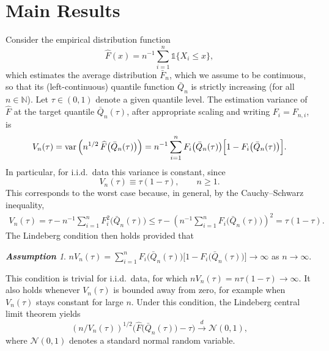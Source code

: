 \documentclass[12pt]{article}
\theoremstyle{remark}
\newtheorem{assumption}{\textbf{Assumption}}
\newcommand{\var}{\operatorname{var}}
\newcommand{\sqrtb}[1]{\left(#1\right)^{1/2}}
\renewcommand{\sqrt}[1]{#1^{1/2}}
\begin{document}
\section{Main Results}
Consider the empirical distribution function
\begin{equation*}
	\widehat F(x)=n^{-1}\sum_{i=1}^{n}\mathds{1}\bigl\{X_i\le x\bigr\},
\end{equation*}
which estimates the average distribution $\bar F_n$, which we assume to be continuous, so that its (left-continuous) quantile function $\bar Q_n$ is strictly increasing (for all $n\in\mathbb{N}$). Let $\tau\in(0,1)$ denote a given quantile level. The estimation variance of $\widehat F$ at the target quantile $\bar Q_n(\tau)$, after appropriate scaling and writing $F_i=F_{n,i}$, is
\begin{equation*}
	V_n(\tau)
	=\var\left(\sqrt{n}\,\widehat F\bigl(\bar Q_n(\tau)\bigr)\right)
	= n^{-1}\sum_{i=1}^{n}F_i\bigl(\bar Q_n(\tau)\bigr)\Bigl[1-F_i\bigl(\bar Q_n(\tau)\bigr)\Bigr].
\end{equation*}
In particular, for i.i.d.\ data this variance is constant, since
\begin{equation*}
	V_n(\tau)\equiv \tau(1-\tau),\qquad n\ge 1.
\end{equation*}
This corresponds to the worst case because, in general, by the Cauchy--Schwarz inequality,
\begin{align*}
    V_n(\tau)
    =\tau-n^{-1}\sum_{i=1}^{n}F_i^2\bigl(\bar Q_n(\tau)\bigr)
    \leq \tau-\left(n^{-1}\sum_{i=1}^{n}F_i\bigl(\bar Q_n(\tau)\bigr)\right)^2
    =\tau(1-\tau).
\end{align*}
The Lindeberg condition then holds provided that
\begin{assumption}\label{ass:lindeberg}
	$nV_n(\tau)
	=\sum_{i=1}^{n}F_i\bigl(\bar Q_n(\tau)\bigr)\bigl[1-F_i\bigl(\bar Q_n(\tau)\bigr)\bigr]
	\rightarrow\infty$
	as $n\rightarrow\infty$.
\end{assumption}
This condition is trivial for i.i.d.\ data, for which
$nV_n(\tau)=n\tau(1-\tau)\rightarrow\infty$. It also holds whenever $V_n(\tau)$ is bounded away from zero, for example when $V_n(\tau)$ stays constant for large $n$. %
Under this condition, the Lindeberg central limit theorem yields
\begin{equation}\label{eqn:clt}
	\sqrtb{n/V_n(\tau)}\bigl(\widehat F\bigl(\bar Q_n(\tau)\bigr)-\tau\bigr)
	\xrightarrow{d}\mathcal{N}(0,1),
\end{equation}
where $\mathcal{N}(0,1)$ denotes a standard normal random variable.
\end{document}
